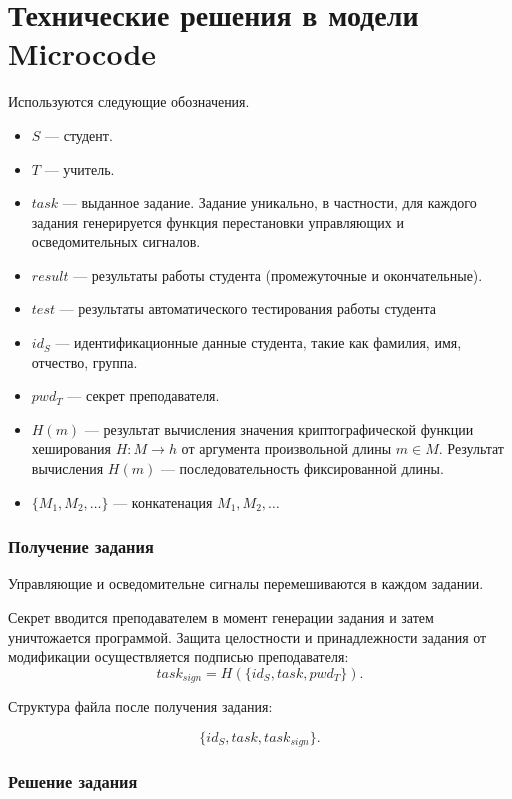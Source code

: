 \section{Технические решения в модели Microcode}

Используются следующие обозначения.
\begin{itemize}
	\item $S$ --- студент.
	\item $T$ --- учитель.
	\item $task$ --- выданное задание. Задание уникально, в частности, для каждого задания генерируется функция перестановки управляющих и осведомительных сигналов.
	\item $result$ --- результаты работы студента (промежуточные и окончательные).
	\item $test$ --- результаты автоматического тестирования работы студента
	\item $id_S$ --- идентификационные данные студента, такие как фамилия, имя, отчество, группа.
	\item $pwd_T$ --- секрет преподавателя.
	\item $H(m)$ --- результат вычисления значения криптографической функции хеширования $H:M\to h$ от аргумента произвольной длины $m\in M$. Результат вычисления $H(m)$ --- последовательность фиксированной длины.
	\item $\{M_1,M_2,\ldots\}$ --- конкатенация $M_1,M_2,\ldots$
\end{itemize}

\subsubsection{Получение задания}


Управляющие и осведомительне сигналы перемешиваются в каждом задании.

Секрет вводится преподавателем в момент генерации задания и затем уничтожается программой. Защита целостности и принадлежности задания от модификации осуществляется подписью преподавателя:
\[task_{sign} = H(\{id_S, task, pwd_T\}).\]

Структура файла после получения задания:

\[\{id_S, task, task_{sign}\}.\]


\subsubsection{Решение задания}


